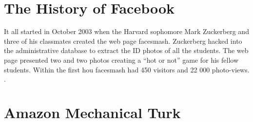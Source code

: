 \section{The History of Facebook}
It all started in October 2003 when the Harvard sophomore Mark Zuckerberg and three of his classmates created the web page facesmash. Zuckerberg hacked into the administrative database to extract the ID photos of all the students. The web page presented two and two photos creating a “hot or not” game for his fellow students. Within the first hou facesmash had 450 visitors and 22 000 photo-views. \cite{FacebookHistory}.


\section{Amazon Mechanical Turk}


